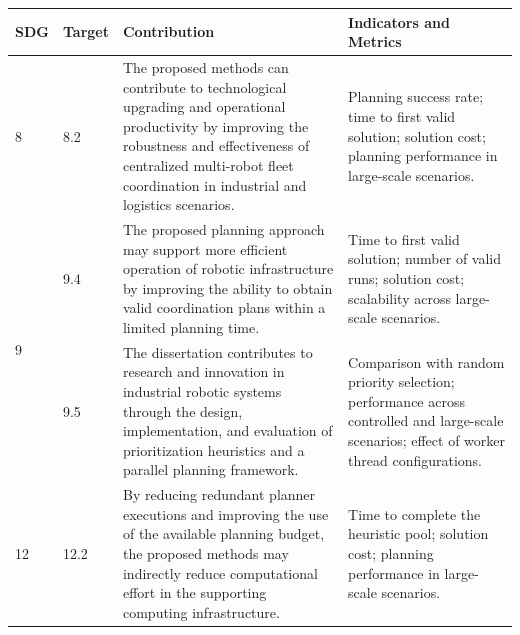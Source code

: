 \begin{center}
\small
\begin{tabular}{|l|l|p{58mm}|p{52mm}|}
\hline
\textbf{SDG} & \textbf{Target} & \textbf{Contribution} & \textbf{Indicators and Metrics} \\
\hline
\hline

\multirow{1}{*}{8}
& 8.2
& The proposed methods can contribute to technological upgrading and operational productivity by improving the robustness and effectiveness of centralized multi-robot fleet coordination in industrial and logistics scenarios.
& Planning success rate; time to first valid solution; solution cost; planning performance in large-scale scenarios. \\
\hline

\multirow{2}{*}{9}
& 9.4
& The proposed planning approach may support more efficient operation of robotic infrastructure by improving the ability to obtain valid coordination plans within a limited planning time.
& Time to first valid solution; number of valid runs; solution cost; scalability across large-scale scenarios. \\
\cline{2-4}

& 9.5
& The dissertation contributes to research and innovation in industrial robotic systems through the design, implementation, and evaluation of prioritization heuristics and a parallel planning framework.
& Comparison with random priority selection; performance across controlled and large-scale scenarios; effect of worker thread configurations. \\
\hline

\multirow{1}{*}{12}
& 12.2
& By reducing redundant planner executions and improving the use of the available planning budget, the proposed methods may indirectly reduce computational effort in the supporting computing infrastructure.
& Time to complete the heuristic pool; solution cost; planning performance in large-scale scenarios. \\
\hline

\end{tabular}
\end{center}